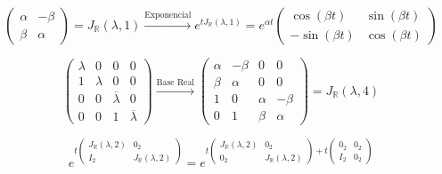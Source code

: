 \[
        \begin{pmatrix}
            \alpha & -\beta \\
            \beta & \alpha
        \end{pmatrix} = J_{\mathbb{R}}(\lambda, 1) \xrightarrow{\text{Exponencial}} e^{t J_{\mathbb{R}}(\lambda, 1)} = e^{\alpha t} \begin{pmatrix} \cos(\beta t) & \sin(\beta t) \\ -\sin(\beta t) & \cos(\beta t) \end{pmatrix}
\]

\[
        \begin{pmatrix}
            \lambda & 0 & 0 & 0 \\
            1 & \lambda & 0 & 0 \\
            0 & 0 & \overline{\lambda} & 0 \\
            0 & 0 & 1 & \overline{\lambda}
        \end{pmatrix} \xrightarrow{\text{Base Real}} \begin{pmatrix}
            \alpha & -\beta & 0 & 0 \\
            \beta & \alpha & 0 & 0 \\
            1 & 0 & \alpha & -\beta \\
            0 & 1 & \beta & \alpha
        \end{pmatrix} = J_{\mathbb{R}}(\lambda, 4)
\]

\[
        e^{t \begin{pmatrix}
            J_{\mathbb{R}}(\lambda, 2) & 0_2 \\
            I_2 & J_{\mathbb{R}}(\lambda, 2)
            \end{pmatrix}} = e^{t \begin{pmatrix}
            J_{\mathbb{R}}(\lambda, 2) & 0_2 \\
            0_2 & J_{\mathbb{R}}(\lambda, 2)
            \end{pmatrix} + t \begin{pmatrix}
            0_2 & 0_2 \\
            I_2 & 0_2
            \end{pmatrix}}
\]

